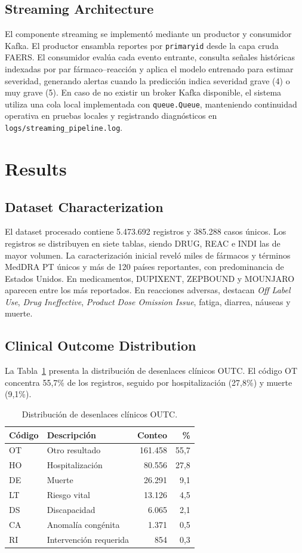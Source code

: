 \documentclass[12pt,a4paper]{article}
\begin{document}
\subsection{Streaming Architecture}
\label{sec:streaming}
El componente streaming se implementó mediante un productor y consumidor Kafka. El productor ensambla reportes por \texttt{primaryid} desde la capa cruda FAERS. El consumidor evalúa cada evento entrante, consulta señales históricas indexadas por par fármaco--reacción y aplica el modelo entrenado para estimar severidad, generando alertas cuando la predicción indica severidad grave (4) o muy grave (5). En caso de no existir un broker Kafka disponible, el sistema utiliza una cola local implementada con \texttt{queue.Queue}, manteniendo continuidad operativa en pruebas locales y registrando diagnósticos en \texttt{logs/streaming\_pipeline.log}.

\section{Results}

\subsection{Dataset Characterization}
El dataset procesado contiene 5.473.692 registros y 385.288 casos únicos. Los registros se distribuyen en siete tablas, siendo DRUG, REAC e INDI las de mayor volumen. La caracterización inicial reveló miles de fármacos y términos MedDRA PT únicos y más de 120 países reportantes, con predominancia de Estados Unidos. En medicamentos, DUPIXENT, ZEPBOUND y MOUNJARO aparecen entre los más reportados. En reacciones adversas, destacan \textit{Off Label Use}, \textit{Drug Ineffective}, \textit{Product Dose Omission Issue}, fatiga, diarrea, náuseas y muerte.

\subsection{Clinical Outcome Distribution}
La Tabla~\ref{tab:outc} presenta la distribución de desenlaces clínicos OUTC. El código OT concentra 55,7\% de los registros, seguido por hospitalización (27,8\%) y muerte (9,1\%).

\begin{table}[H]
\centering
\caption{Distribución de desenlaces clínicos OUTC.}
\label{tab:outc}
\small
\begin{tabular}{@{}llrr@{}}
\toprule
\textbf{Código} & \textbf{Descripción} & \textbf{Conteo} & \textbf{\%} \\
\midrule
OT & Otro resultado & 161.458 & 55,7 \\
HO & Hospitalización & 80.556 & 27,8 \\
DE & Muerte & 26.291 & 9,1 \\
LT & Riesgo vital & 13.126 & 4,5 \\
DS & Discapacidad & 6.065 & 2,1 \\
CA & Anomalía congénita & 1.371 & 0,5 \\
RI & Intervención requerida & 854 & 0,3 \\
\bottomrule
\end{tabular}
\end{table}
\end{document}

